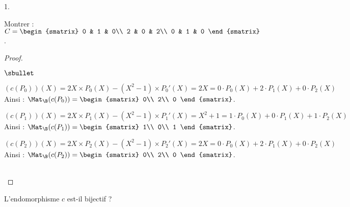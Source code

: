 \begin{noliste}{1.}
\setlength{\itemsep}{2mm}
\setcounter{enumi}{5}
\item Montrer : $C=\begin{smatrix}
0 & 1 & 0\\ 
2 & 0 & 2\\ 
0 & 1 & 0
\end{smatrix}$.

\begin{proof}~
\begin{noliste}{$\sbullet$}
\item $(c(P_0))(X)=2X\times P_0(X)-(X^2-1)\times P_0'(X)=2X=0\cdot 
P_0(X)+2\cdot P_1(X)+0\cdot P_2(X)$\\[.2cm]
Ainsi : $\Mat_{\B}(c(P_0)) =
	\begin{smatrix}
	 0\\
	 2\\
	 0
	\end{smatrix}$.

\item $(c(P_1))(X)=2X\times P_1(X) - (X^2-1)\times P_1'(X) 
=X^2+1=1\cdot P_0(X)+0\cdot 
P_1(X)+1\cdot P_2(X)$\\[.2cm]
Ainsi : $\Mat_{\B}(c(P_1)) =
	\begin{smatrix}
	 1\\
	 0\\
	 1
	\end{smatrix}$.
	
\item $(c(P_2))(X)=2X\times P_2(X) - (X^2-1)\times P_2'(X)=2X=0\cdot 
P_0(X)+2\cdot P_1(X)+0\cdot P_2(X)$\\[.2cm]
Ainsi : $\Mat_{\B}(c(P_2)) =
	\begin{smatrix}
	 0\\
	 2\\
	 0
	\end{smatrix}$.
\end{noliste}

~\\[-1cm]
\end{proof}

\item L'endomorphisme $c$ est-il bijectif ?


\end{noliste}
